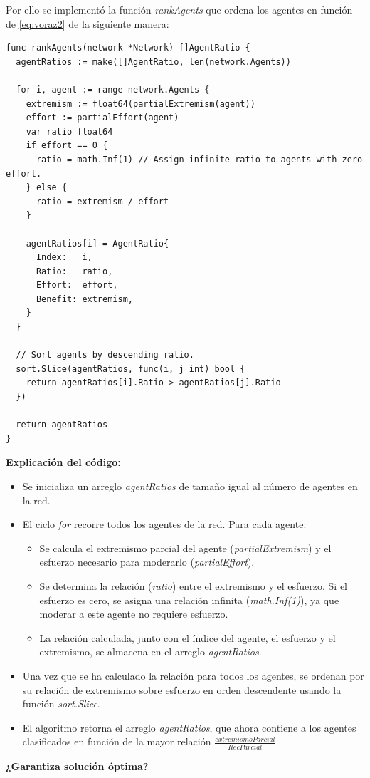 \documentclass[letterpaper,10pt]{article}
\begin{document}
Por ello se implementó la función \textit{rankAgents} que ordena los agentes en función de \eqref{eq:voraz2} de la siguiente manera:
\begin{lstlisting}[caption={Rank Agents}, label={lst:rank_agents}]
func rankAgents(network *Network) []AgentRatio {
  agentRatios := make([]AgentRatio, len(network.Agents))

  for i, agent := range network.Agents {
    extremism := float64(partialExtremism(agent))
    effort := partialEffort(agent)
    var ratio float64
    if effort == 0 {
      ratio = math.Inf(1) // Assign infinite ratio to agents with zero effort.
    } else {
      ratio = extremism / effort
    }

    agentRatios[i] = AgentRatio{
      Index:   i,
      Ratio:   ratio,
      Effort:  effort,
      Benefit: extremism,
    }
  }

  // Sort agents by descending ratio.
  sort.Slice(agentRatios, func(i, j int) bool {
    return agentRatios[i].Ratio > agentRatios[j].Ratio
  })

  return agentRatios
}
\end{lstlisting}
\textbf{Explicación del código:}
\begin{itemize}
  \item Se inicializa un arreglo \textit{agentRatios} de tamaño igual al número de agentes en la red.
  \item El ciclo \textit{for} recorre todos los agentes de la red. Para cada agente:
  \begin{itemize}
    \item Se calcula el extremismo parcial del agente (\textit{partialExtremism}) y el esfuerzo necesario para moderarlo (\textit{partialEffort}).
    \item Se determina la relación (\textit{ratio}) entre el extremismo y el esfuerzo. Si el esfuerzo es cero, se asigna una relación infinita (\textit{math.Inf(1)}), ya que moderar a este agente no requiere esfuerzo.
    \item La relación calculada, junto con el índice del agente, el esfuerzo y el extremismo, se almacena en el arreglo \textit{agentRatios}.
  \end{itemize}
  \item Una vez que se ha calculado la relación para todos los agentes, se ordenan por su relación de extremismo sobre esfuerzo en orden descendente usando la función \textit{sort.Slice}.
  \item El algoritmo retorna el arreglo \textit{agentRatios}, que ahora contiene a los agentes clasificados en función de la mayor relación $\frac{extremismoParcial}{RecParcial}$.
\end{itemize}
\textbf{¿Garantiza solución óptima?}
\end{document}
